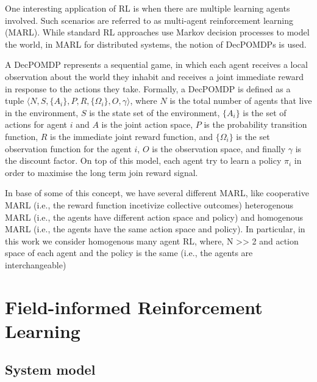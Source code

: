 \documentclass[conference]{IEEEtran}
\begin{document}
One interesting application of RL is when there are multiple learning agents involved. 
 Such scenarios are referred to as multi-agent reinforcement learning (MARL). 
 While standard RL approaches use Markov decision processes to model the world, 
 in MARL for distributed systems, the notion of 
 \acp{DecPOMDP} is used.

A \ac{DecPOMDP} represents a sequential game, 
 in which each agent receives a local observation about the world they 
 inhabit and receives a joint immediate reward in response to the actions they take. 
% 
Formally, a DecPOMDP is defined as a tuple $\langle N, S, \{A_i\}, P, R, \{\Omega_i\}, O, \gamma \rangle$, 
 where $N$ is the total number of agents that live in the environment, 
 $S$ is the state set of the environment, 
 $\{A_i\}$ is the set of actions for agent $i$ and $A$ is the joint action space, 
 $P$ is the probability transition function, 
 $R$ is the immediate joint reward function, and 
 $\{\Omega_i\}$ is the set observation function for the agent $i$,
 $O$ is the observation space, and finally $\gamma$ is the discount factor.
%
On top of this model, each agent try to learn a policy $\pi_i$ in order 
 to maximise the long term join reward signal.

In base of some of this concept, 
 we have several different MARL, like cooperative MARL (i.e., the reward function incetivize collective outcomes)
 heterogenous MARL (i.e., the agents have different action space and policy) and
 homogenous MARL (i.e., the agents have the same action space and policy).
%  
In particular, in this work we consider homogenous many agent RL, 
 where, N >> 2 and action space of each agent and the policy is the same (i.e., the agents are interchangeable)
\section{Field-informed Reinforcement Learning}
\label{sec:approach}
\subsection{System model}
\end{document}

